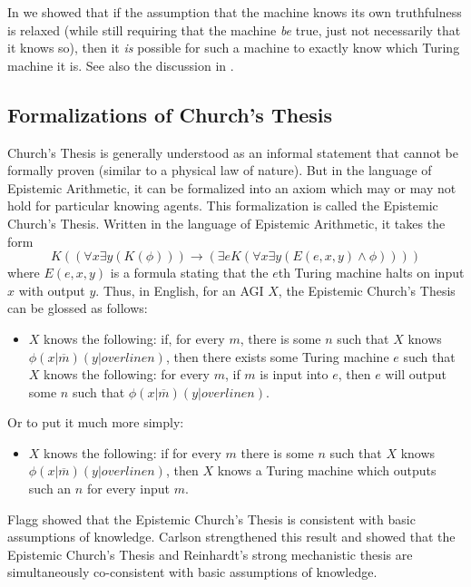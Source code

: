 \documentclass[runningheads]{llncs}
\begin{document}
In \cite{alexander2014machine} we showed that if the assumption that the
machine knows its own truthfulness is relaxed (while still requiring that
the machine \emph{be} true, just not necessarily that it knows so),
then it \emph{is} possible for such a machine to exactly know which
Turing machine it is. See also the discussion in \cite{aldini2015theory}.



\subsection{Formalizations of Church's Thesis}

Church's Thesis is generally understood as an informal statement that cannot
be formally proven (similar to a physical law of nature).
But in the language of Epistemic Arithmetic, it can be formalized into an
axiom which may or may not hold for particular knowing agents. This formalization
is called the Epistemic Church's Thesis. Written in the language of Epistemic
Arithmetic, it takes the form
\[
  K( ( \forall x\exists y (K(\phi))  ) \rightarrow
  ( \exists e K( \forall x\exists y ( E(e,x,y) \wedge \phi  )  )  )  )
\]
where $E(e,x,y)$ is a formula stating that the $e$th Turing machine
halts on input $x$ with output $y$.
Thus, in English, for an AGI $X$,
the Epistemic Church's Thesis can be glossed as follows:
\begin{itemize}
  \item
  $X$ knows the following: if, for every $m$, there is some $n$ such that
  $X$ knows $\phi(x|\overline m)(y|overline n)$, then there exists some
  Turing machine $e$ such that $X$ knows the following:
  for every $m$, if $m$ is input into $e$, then $e$ will output
  some $n$ such that $\phi(x|\overline m)(y|overline n)$.
\end{itemize}
Or to put it much more simply:
\begin{itemize}
  \item
  $X$ knows the following: if for every $m$ there is some $n$ such that
  $X$ knows $\phi(x|\overline m)(y|overline n)$, then $X$ knows a Turing
  machine which outputs such an $n$ for every input $m$.
\end{itemize}
Flagg showed \cite{flagg1985church} that the Epistemic Church's Thesis is
consistent with basic assumptions of knowledge. Carlson strengthened this
result and showed \cite{carlson2016collapsing} that the Epistemic Church's
Thesis and Reinhardt's strong mechanistic thesis are simultaneously
co-consistent with basic assumptions of knowledge.
\end{document}
